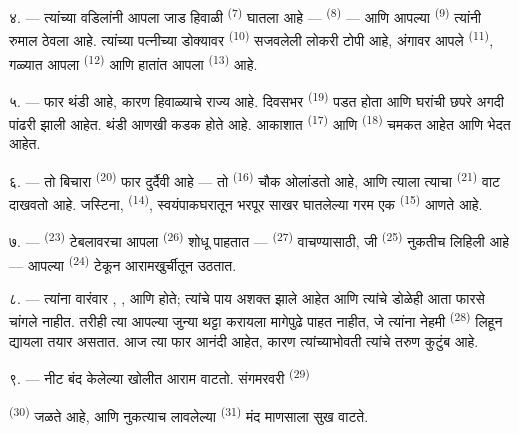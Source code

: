 ४. --- त्यांच्या वडिलांनी आपला जाड हिवाळी 
\textsuperscript{(7)} घातला आहे ---  \textsuperscript{(8)}
--- आणि आपल्या  \textsuperscript{(9)} त्यांनी रुमाल ठेवला आहे.
त्यांच्या पत्नीच्या डोक्यावर  \textsuperscript{(10)} सजवलेली
लोकरी टोपी आहे, अंगावर आपले  \textsuperscript{(11)}, गळ्यात आपला
 \textsuperscript{(12)} आणि हातांत आपला 
\textsuperscript{(13)} आहे.

५. --- फार थंडी आहे, कारण हिवाळ्याचे राज्य आहे. दिवसभर 
\textsuperscript{(19)} पडत होता आणि घरांची छपरे अगदी पांढरी झाली आहेत.
 थंडी आणखी कडक होते आहे. आकाशात 
\textsuperscript{(17)} आणि  \textsuperscript{(18)} चमकत आहेत आणि
 भेदत आहेत.

\VUsaut{4.2mm}
\VUsaut{3.0mm}

६. --- तो बिचारा  \textsuperscript{(20)} फार दुर्दैवी आहे --- तो
 \textsuperscript{(16)} चौक ओलांडतो आहे, आणि
त्याला त्याचा  \textsuperscript{(21)} वाट दाखवतो आहे.
जस्टिना,  \textsuperscript{(14)}, स्वयंपाकघरातून भरपूर साखर
घातलेल्या गरम  एक  \textsuperscript{(15)} आणते
आहे.

७. ---  \textsuperscript{(23)} टेबलावरचा आपला 
\textsuperscript{(26)} शोधू पाहतात --- 
\textsuperscript{(27)} वाचण्यासाठी, जी  \textsuperscript{(25)}
नुकतीच लिहिली आहे ---
आपल्या  \textsuperscript{(24)} टेकून आरामखुर्चीतून उठतात.

८. --- त्यांना वारंवार , ,  आणि
 होते; त्यांचे पाय अशक्त झाले आहेत आणि त्यांचे डोळेही आता फारसे
चांगले नाहीत. तरीही त्या आपल्या जुन्या  थट्टा करायला मागेपुढे
पाहत नाहीत, जे त्यांना नेहमी  \textsuperscript{(28)} लिहून द्यायला
तयार असतात. आज त्या फार आनंदी आहेत, कारण त्यांच्याभोवती त्यांचे तरुण कुटुंब आहे.

९. --- नीट बंद केलेल्या खोलीत आराम वाटतो. संगमरवरी 
\textsuperscript{(29)}

 \textsuperscript{(30)} जळते आहे, आणि नुकत्याच लावलेल्या
 \textsuperscript{(31)} मंद  माणसाला सुख वाटते.

